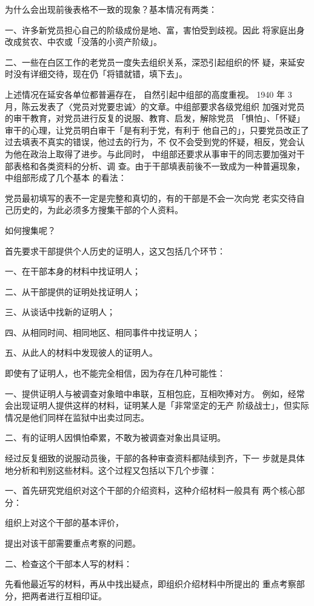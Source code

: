 为什么会出现前後表格不一致的现象？基本情况有两类：

一、许多新党员担心自己的阶级成份是地、富，害怕受到歧视。因此
将家庭出身改成贫农、中农或「没落的小资产阶级」。

二、一些在白区工作的老党员一度失去组织关系，深恐引起组织的怀
疑，来延安时没有详细交待，现在仍「将错就错，填下去」。

上述情况在延安各单位都普遍存在，
自然引起中组部的高度重视。
1940
年 3 月，陈云发表了〈党员对党要忠诚〉的文章。中组部要求各级党组织
加强对党员的审干教育，对党员进行反复的说服、教育、启发，解除党员
「惧怕」、「怀疑」审干的心理，让党员明白审干「是有利于党，有利于
他自己的」，只要党员改正了过去填表不真实的错误，他过去的行为，不
仅不会受到党的怀疑，相反，党会认为他在政治上取得了进步。与此同时，
中组部还要求从事审干的同志要加强对干部表格和各类资料的分析、调
查。由于干部填表前後不一致成为一种普遍现象，中组部形成了几个基本
的看法：

党员最初填写的表不一定是完整和真切的，有的干部是不会一次向党
老实交待自己历史的，为此必须多方搜集干部的个人资料。

如何搜集呢？

首先要求干部提供个人历史的证明人，这又包括几个环节：

一、在干部本身的材料中找证明人；

二、从干部提供的证明处找证明人；

三、从谈话中找新的证明人；

四、从相同时间、相同地区、相同事件中找证明人；

五、从此人的材料中发现彼人的证明人。

即使有了证明人，也不能完全相信，因为存在几种可能性：

一、提供证明人与被调查对象暗中串联，互相包庇，互相吹捧对方。
例如，经常会出现证明人提供这样的材料，证明某人是「非常坚定的无产
阶级战士」，但实际情况是他们同样在监狱中出卖过同志。
 
二、有的证明人因惧怕牵累，不敢为被调查对象出具证明。

经过反复细致的说服动员後，干部的各种审查资料都陆续到齐，下一
步就是具体地分析和判别这些材料。这个过程又包括以下几个步骤：

一、首先研究党组织对这个干部的介绍资料，这种介绍材料一般具有
两个核心部分：

组织上对这个干部的基本评价，

提出对该干部需要重点考察的问题。

二、检查这个干部本人写的材料：

先看他最近写的材料，再从中找出疑点，即组织介绍材料中所提出的
重点考察部分，把两者进行互相印证。

